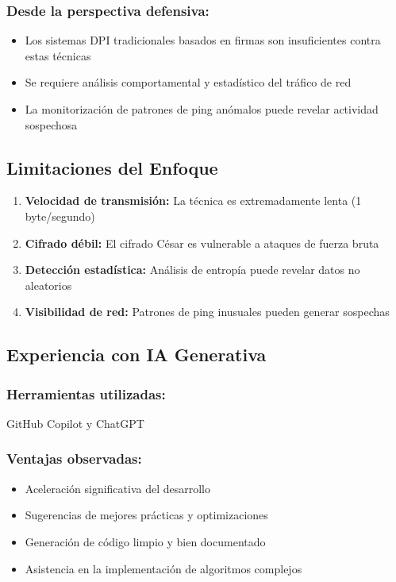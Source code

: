 \documentclass[letter,12pt]{article}
\begin{document}
\subsubsection*{Desde la perspectiva defensiva:}
\begin{itemize}
    \item Los sistemas DPI tradicionales basados en firmas son insuficientes contra estas técnicas
    
    \item Se requiere análisis comportamental y estadístico del tráfico de red
    
    \item La monitorización de patrones de ping anómalos puede revelar actividad sospechosa
\end{itemize}

\subsection*{Limitaciones del Enfoque}

\begin{enumerate}
    \item \textbf{Velocidad de transmisión:} La técnica es extremadamente lenta (1 byte/segundo)
    
    \item \textbf{Cifrado débil:} El cifrado César es vulnerable a ataques de fuerza bruta
    
    \item \textbf{Detección estadística:} Análisis de entropía puede revelar datos no aleatorios
    
    \item \textbf{Visibilidad de red:} Patrones de ping inusuales pueden generar sospechas
\end{enumerate}

\subsection*{Experiencia con IA Generativa}

\subsubsection*{Herramientas utilizadas:} GitHub Copilot y ChatGPT

\subsubsection*{Ventajas observadas:}
\begin{itemize}
    \item Aceleración significativa del desarrollo
    
    \item Sugerencias de mejores prácticas y optimizaciones
    
    \item Generación de código limpio y bien documentado
    
    \item Asistencia en la implementación de algoritmos complejos
\end{itemize}
\end{document}
